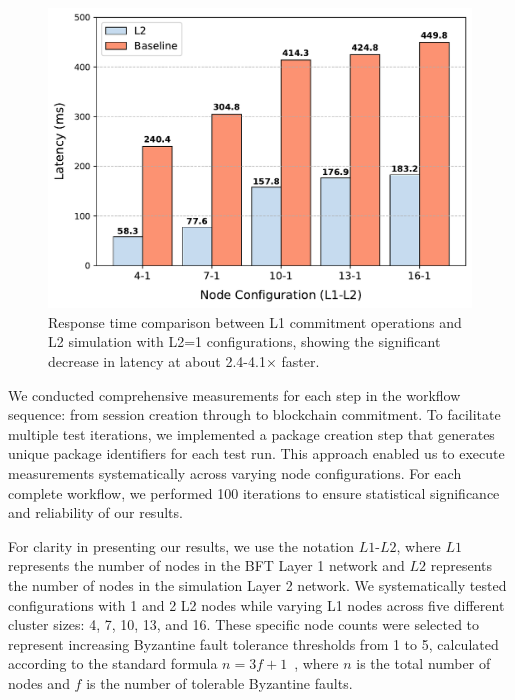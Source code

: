 \documentclass[conference]{IEEEtran}
\begin{document}
\begin{figure}[t]
    \centering
    \includegraphics[width=1\linewidth]{figure/l1_vs_l2_comparison_l2_1.pdf}
    \caption{Response time comparison between L1 commitment operations and L2 simulation with L2=1 configurations, showing the significant decrease in latency at about 2.4-4.1× faster.}
    \label{fig:baseline-comparison-l2-1}
\end{figure}

We conducted comprehensive measurements for each step in the workflow sequence: from session creation through to blockchain commitment. To facilitate multiple test iterations, we implemented a package creation step that generates unique package identifiers for each test run. This approach enabled us to execute measurements systematically across varying node configurations. For each complete workflow, we performed 100 iterations to ensure statistical significance and reliability of our results.

For clarity in presenting our results, we use the notation $L1$-$L2$, where $L1$ represents the number of nodes in the BFT Layer 1 network and $L2$ represents the number of nodes in the simulation Layer 2 network. We systematically tested configurations with 1 and 2 L2 nodes while varying L1 nodes across five different cluster sizes: 4, 7, 10, 13, and 16. These specific node counts were selected to represent increasing Byzantine fault tolerance thresholds from 1 to 5, calculated according to the standard formula $n = 3f+1$~\cite{lamport_byzantine_1982}, where $n$ is the total number of nodes and $f$ is the number of tolerable Byzantine faults.
\end{document}
